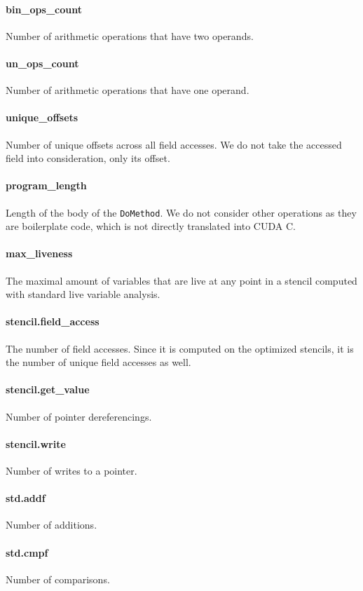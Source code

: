 \documentclass[sigplan,\review anonymous]{acmart}
\begin{document}
\paragraph{bin\_ops\_count} Number of arithmetic operations that have two
  operands.
\paragraph{un\_ops\_count} Number of arithmetic operations that have one
  operand.
\paragraph{unique\_offsets} Number of unique offsets across all field
  accesses. We do not take the accessed field into consideration, only its 
  offset.
\paragraph{program\_length} Length of the body of the \texttt{DoMethod}.
  We do not consider other operations as they are boilerplate code, which is
  not directly translated into CUDA C.
\paragraph{max\_liveness} The maximal amount of variables that are live
  at any point in a stencil computed with standard live variable analysis.
\paragraph{stencil.field\_access} The number of field accesses. Since
  it is computed on the optimized stencils, it is the number of unique field
  accesses as well.
\paragraph{stencil.get\_value} Number of pointer dereferencings.
\paragraph{stencil.write} Number of writes to a pointer.
\paragraph{std.addf} Number of additions.
\paragraph{std.cmpf} Number of comparisons.
\end{document}
